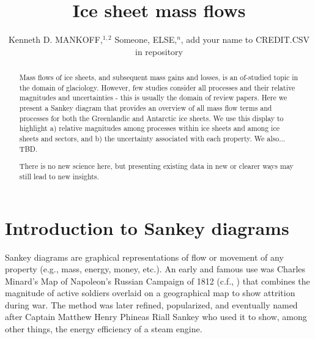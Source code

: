 \documentclass[review,jog]{igs}
\begin{document}
\title[Sankey mass flows]{Ice sheet mass flows}

\author[Mankoff and others]
       {Kenneth D. MANKOFF,$^{1,2}$
         Someone, ELSE,$^n$,
       add your name to CREDIT.CSV in repository}


\begin{frontmatter}
\maketitle
\begin{abstract}
  Mass flows of ice sheets, and subsequent mass gains and losses, is an of-studied topic in the domain of glaciology. However, few studies consider all processes and their relative magnitudes and uncertainties - this is usually the domain of review papers. Here we present a Sankey diagram that provides an overview of all mass flow terms and processes for both the Greenlandic and Antarctic ice sheets. We use this display to highlight a) relative magnitudes among processes within ice sheets and among ice sheets and sectors, and b) the uncertainty associated with each property. We also... TBD.

  There is no new science here, but presenting existing data in new or clearer ways may still lead to new insights.
\end{abstract}
\end{frontmatter}

\section{Introduction to Sankey diagrams}

Sankey diagrams are graphical representations of flow or movement of any property (e.g., mass, energy, money, etc.). An early and famous use was Charles Minard's Map of Napoleon's Russian Campaign of 1812 (c.f., \citet{kraak_2021}) that combines the magnitude of active soldiers overlaid on a geographical map to show attrition during war. The method was later refined, popularized, and eventually named after Captain Matthew Henry Phineas Riall Sankey who used it to show, among other things, the energy efficiency of a steam engine.
\end{document}
